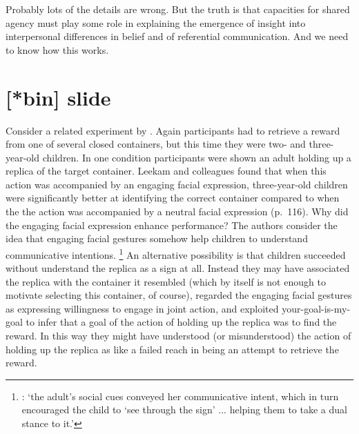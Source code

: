\documentclass[12pt,\papersize]{extarticle}
\begin{document}
Probably lots of the details are wrong.
But the truth is that capacities for shared agency 
must play some role in explaining the emergence 
	of insight into interpersonal differences in belief 
and
	of referential communication.
And we need to know how this works.



\section{[*bin] slide}
Consider a related experiment by \citet{leekam_adults_2010}.
Again participants had to retrieve a reward from one of several closed containers, but this time they were two- and three-year-old children.
In one condition participants were shown an adult holding up a replica of the target container.
Leekam and colleagues found that 
when this action was accompanied by an engaging facial expression,
three-year-old children were significantly better at identifying the correct container compared to
when the the action was accompanied by a neutral facial expression (p.\ 116).
Why did the engaging facial expression enhance performance?
The authors consider the idea that 
engaging facial gestures somehow help children to understand communicative intentions.%
\footnote{
\citet[p.\ 118]{leekam_adults_2010}: `the adult’s social cues conveyed her communicative intent, which in turn encouraged the child to ‘see through the sign’ ... helping them  to take a dual stance to it.'
}
An alternative possibility is that children succeeded without understand the replica as a sign at all.
Instead they may have 
associated the replica with the container it resembled
(which by itself is not enough to motivate selecting this container, of course),
regarded the engaging facial gestures as expressing willingness to engage in joint action,
and 
exploited your-goal-is-my-goal 
	to infer that a goal of the action of holding up the replica was to find the reward.
In this way they might have understood (or misunderstood) the action of holding up the replica as 
like a failed reach
in being an attempt to retrieve the reward.






\small

\end{document}
